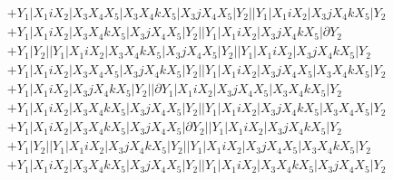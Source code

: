 \documentclass{article}[12pt]
\begin{document}
\begin{align*}
 & +Y_1|X_1iX_2|X_3X_4X_5|X_3X_4kX_5|X_3jX_4X_5|Y_2||Y_1|X_1iX_2|X_3jX_4kX_5|Y_2\\ 
 & +Y_1|X_1iX_2|X_3X_4kX_5|X_3jX_4X_5|Y_2||Y_1|X_1iX_2|X_3jX_4kX_5|\partial Y_2\\ 
 & +Y_1|Y_2||Y_1|X_1iX_2|X_3X_4kX_5|X_3jX_4X_5|Y_2||Y_1|X_1iX_2|X_3jX_4kX_5|Y_2\\ 
 & +Y_1|X_1iX_2|X_3X_4X_5|X_3jX_4kX_5|Y_2||Y_1|X_1iX_2|X_3jX_4X_5|X_3X_4kX_5|Y_2\\ 
 & +Y_1|X_1iX_2|X_3jX_4kX_5|Y_2||\partial Y_1|X_1iX_2|X_3jX_4X_5|X_3X_4kX_5|Y_2\\ 
 & +Y_1|X_1iX_2|X_3X_4kX_5|X_3jX_4X_5|Y_2||Y_1|X_1iX_2|X_3jX_4kX_5|X_3X_4X_5|Y_2\\ 
 & +Y_1|X_1iX_2|X_3X_4kX_5|X_3jX_4X_5|\partial Y_2||Y_1|X_1iX_2|X_3jX_4kX_5|Y_2\\ 
 & +Y_1|Y_2||Y_1|X_1iX_2|X_3jX_4kX_5|Y_2||Y_1|X_1iX_2|X_3jX_4X_5|X_3X_4kX_5|Y_2\\ 
 & +Y_1|X_1iX_2|X_3X_4kX_5|X_3jX_4X_5|Y_2||Y_1|X_1iX_2|X_3X_4kX_5|X_3jX_4X_5|Y_2\end{align*}
 
 
\end{document}
